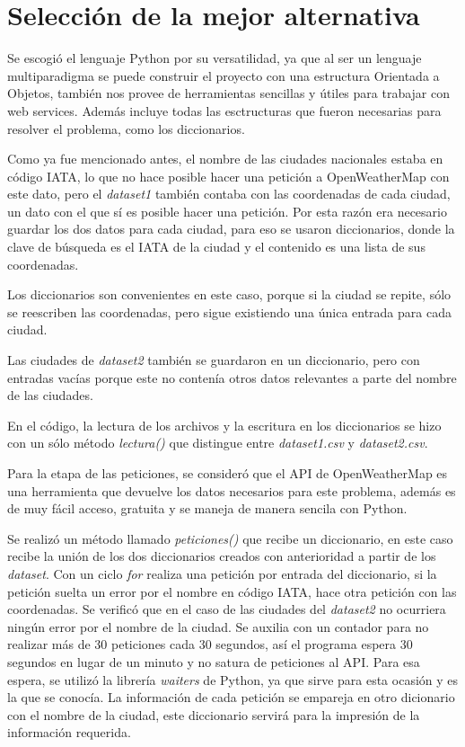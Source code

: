 \documentclass[]{article}
\begin{document}
\section{Selección de la mejor alternativa}
Se escogió el lenguaje Python por su versatilidad, ya que al ser un lenguaje
multiparadigma se puede construir el proyecto con una estructura Orientada
a Objetos, también nos provee de herramientas sencillas y útiles para
trabajar con web services. Además incluye todas las esctructuras que fueron
necesarias para resolver el problema, como los diccionarios.

Como ya fue mencionado antes, el nombre de las ciudades nacionales estaba
en código IATA, lo que no hace posible hacer una petición a
OpenWeatherMap con este dato, pero el \emph{dataset1} también contaba
con las coordenadas de cada ciudad, un dato con el que sí es posible hacer
una petición. Por esta razón era necesario guardar los dos datos para cada
ciudad, para eso se usaron diccionarios, donde la clave de búsqueda es el
IATA de la ciudad y el contenido es una lista de sus coordenadas.

Los diccionarios son convenientes en este caso, porque si la ciudad se repite,
sólo se reescriben las coordenadas, pero sigue existiendo una única entrada
para cada ciudad.

Las ciudades de \emph{dataset2} también se guardaron en un diccionario,
pero con entradas vacías porque este no contenía otros datos relevantes a
parte del nombre de las ciudades.

En el código, la lectura de los archivos y la escritura en los diccionarios se
hizo con un sólo método \emph{lectura()} que distingue entre
\emph{dataset1.csv} y \emph{dataset2.csv}.

Para la etapa de las peticiones, se consideró que el API de OpenWeatherMap
es una herramienta que devuelve los datos necesarios para este problema,
además es de muy fácil acceso, gratuita y se maneja de manera sencila con
Python.

Se realizó un método llamado \emph{peticiones()} que recibe un diccionario,
en este caso recibe la unión de los dos diccionarios creados con anterioridad
a partir de los \emph{dataset}. Con un ciclo \emph{for} realiza una petición
por entrada del diccionario, si la petición suelta un error por el nombre en
código IATA, hace otra petición con las coordenadas. Se verificó que en el
caso de las ciudades del \emph{dataset2} no ocurriera ningún error por el
nombre de la ciudad. Se auxilia con un contador para no realizar más de 30
peticiones cada 30 segundos, así el programa espera 30 segundos en lugar
de un minuto y no satura de peticiones al API. Para esa espera, se utilizó la
librería \emph{waiters} de Python, ya que sirve para esta ocasión y es la que
se conocía. La información de cada petición se empareja en otro dicionario
con el nombre de la ciudad, este diccionario servirá para la impresión de la
información requerida.
\end{document}
